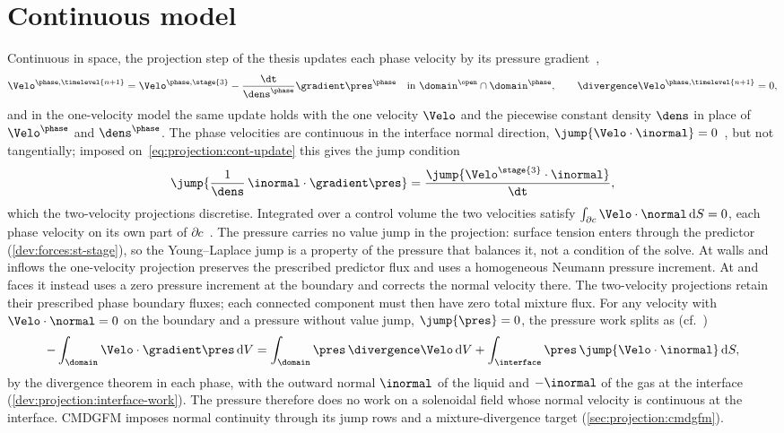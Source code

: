 \section{Continuous model}\label{sec:projection:continuous}
Continuous in space, the projection step of the thesis updates each phase
velocity by its pressure gradient~,
\begin{equation}\label{eq:projection:cont-update}
  \Velo^{\phase,\timelevel{n+1}}=\Velo^{\phase,\stage{3}}-\frac{\dt}{\dens^{\phase}}\gradient\pres^{\phase}
  \quad\text{in }\domain^{\open}\cap\domain^{\phase},
  \qquad
  \divergence\Velo^{\phase,\timelevel{n+1}}=0,
\end{equation}
and in the one-velocity model the same update holds with the one velocity
$\Velo$ and the piecewise constant density $\dens$ in place of
$\Velo^{\phase}$ and $\dens^{\phase}$. The phase velocities are continuous in
the interface normal direction, $\jump{\Velo\cdot\inormal}=0$~,
but not tangentially; imposed on~\cref{eq:projection:cont-update} this gives the
jump condition~
\begin{equation}\label{eq:projection:cont-gradjump}
  \jump{\frac{1}{\dens}\,\inormal\cdot\gradient\pres}=\frac{\jump{\Velo^{\stage{3}}\cdot\inormal}}{\dt},
\end{equation}
which the two-velocity projections discretise. Integrated over a control
volume the two velocities satisfy
$\integral{\partial c}{\Velo\cdot\normal}{S}=0$, each phase velocity on its own
part of $\partial c$~. The pressure carries no value jump
in the projection: surface tension enters through the predictor
(\cref{dev:forces:st-stage}), so the Young--Laplace jump is a property of the
pressure that balances it, not a condition of the solve. At walls and inflows
the one-velocity projection preserves the prescribed predictor flux and uses
a homogeneous Neumann pressure increment. At  and
 faces it instead uses a zero pressure
increment at the boundary and corrects the normal velocity there. The
two-velocity projections retain their prescribed phase boundary fluxes; each
connected component must then have zero total mixture flux.
For any velocity with $\Velo\cdot\normal=0$ on the boundary and a pressure
without value jump, $\jump{\pres}=0$, the pressure work splits
as (cf.~)
\begin{equation}\label{eq:projection:cont-energy}
  -\integral{\domain}{\Velo\cdot\gradient\pres}{V}=\integral{\domain}{\pres\,\divergence\Velo}{V}+\integral{\interface}{\pres\,\jump{\Velo\cdot\inormal}}{S},
\end{equation}
by the divergence theorem in each phase, with the outward normal $\inormal$
of the liquid and $-\inormal$ of the gas at the interface
(\cref{dev:projection:interface-work}). The pressure therefore does
no work on a solenoidal field whose normal velocity is continuous at the
interface. CMDGFM imposes normal continuity through its jump rows and a
mixture-divergence target (\cref{sec:projection:cmdgfm}).

